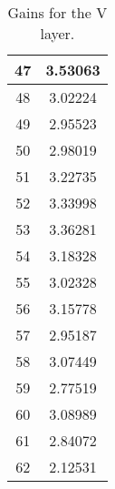 \begin{table}[h]
\begin{subtable}[h]{2in}
{\begin{tabular}{|c|c|}
47	&	3.53063	\\	\hline
48	&	3.02224	\\	\hline
49	&	2.95523	\\	\hline
50	&	2.98019	\\	\hline
51	&	3.22735	\\	\hline
52	&	3.33998	\\	\hline
53	&	3.36281	\\	\hline
54	&	3.18328	\\	\hline
55	&	3.02328	\\	\hline
56	&	3.15778	\\	\hline
57	&	2.95187	\\	\hline
58	&	3.07449	\\	\hline
59	&	2.77519	\\	\hline
60	&	3.08989	\\	\hline
61	&	2.84072	\\	\hline
62	&	2.12531	\\	\hline
        \end{tabular}
        }
        \caption{Gains for the V layer.}
    \end{subtable}
    \quad
    \begin{subtable}[h]{2in}
        \centering{}
\end{subtable}
\end{table}
